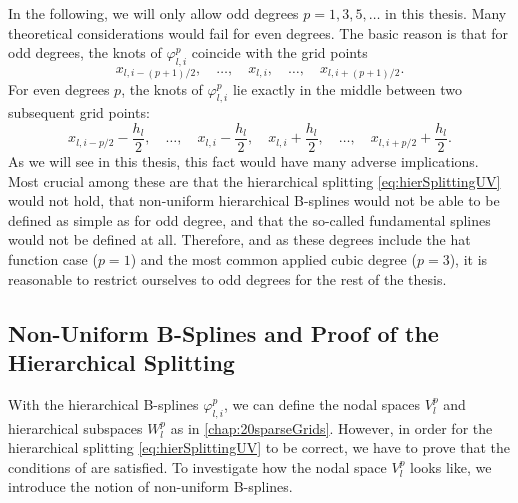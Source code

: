 In the following, we will only allow odd degrees $p = 1, 3, 5, \dotsc$
in this thesis.
Many theoretical considerations would fail for even degrees.
The basic reason is that for odd degrees, the knots of
$\varphi_{l,i}^p$ coincide with the grid points
\begin{equation}
  x_{l,i-(p+1)/2},\quad
  \dotsc,\quad
  x_{l,i},\quad
  \dotsc,\quad
  x_{l,i+(p+1)/2}.
\end{equation}
For even degrees $p$, the knots of $\varphi_{l,i}^p$ lie exactly in
the middle between two subsequent grid points:
\begin{equation}
  x_{l,i-p/2} - \frac{h_l}{2},\quad
  \dotsc,\quad
  x_{l,i} - \frac{h_l}{2},\quad
  x_{l,i} + \frac{h_l}{2},\quad
  \dotsc,\quad
  x_{l,i+p/2} + \frac{h_l}{2}.
\end{equation}
As we will see in this thesis,
this fact would have many adverse implications.
Most crucial among these are
that the hierarchical splitting \eqref{eq:hierSplittingUV} would not hold,
that non-uniform hierarchical B-splines would not be able to be defined as
simple as for odd degree,
 and
that the so-called fundamental splines would not be defined at all.
Therefore, and
as these degrees include the hat function case ($p = 1$) and the
most common applied cubic degree ($p = 3$),
it is reasonable to restrict ourselves to odd degrees
for the rest of the thesis.



\subsection{Non-Uniform B-Splines and Proof of the Hierarchical Splitting}

With the hierarchical B-splines $\varphi_{l,i}^p$, we can define
the nodal spaces $V_l^p$ and hierarchical subspaces $W_l^p$
as in \cref{chap:20sparseGrids}.
However, in order for the hierarchical splitting \eqref{eq:hierSplittingUV}
to be correct, we have to prove that the conditions of
 are satisfied.
To investigate how the nodal space $V_l^p$ looks like,
we introduce the notion of non-uniform B-splines.

